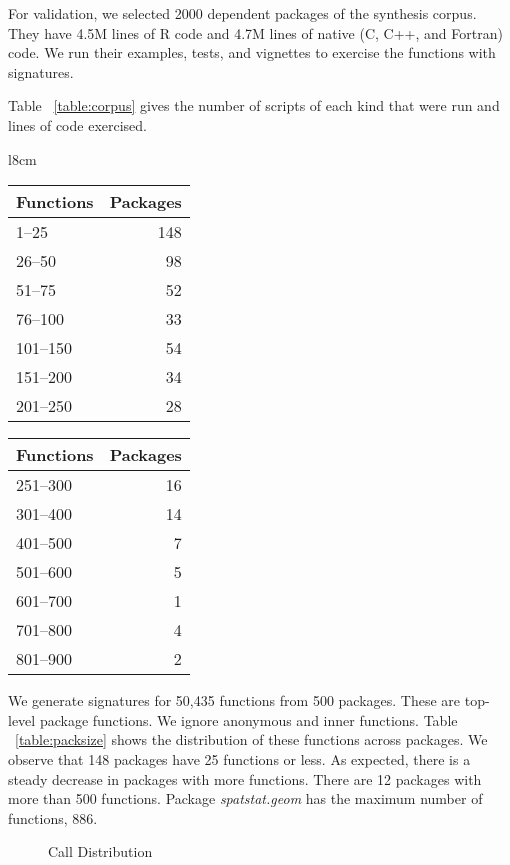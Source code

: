 \documentclass[review,nonacm,screen,acmsmall,anonymous=true]{acmart}
\begin{document}
For validation, we selected 2000 dependent packages of the synthesis
corpus. They have 4.5M lines of R code and 4.7M lines of native (C, C++, and
Fortran) code. We run their examples, tests, and vignettes to exercise the
functions with signatures.

Table ~\ref{table:corpus} gives the number of scripts of each kind that were run
and lines of code exercised.

\begin{wraptable}{l}{8cm}
  \vspace{-3mm}
  \small
  \caption{Package Size} \label{table:packsize}
  \centering
  \begin{tabular}{lr}
    \toprule
    \bf Functions&\bf Packages\\
    \midrule
    1--25&148\\
    26--50&98\\
    51--75&52\\
    76--100&33\\
    101--150&54\\
    151--200&34\\
    201--250&28\\
    \bottomrule
  \end{tabular}
  \quad
  \begin{tabular}{lr}
    \toprule
    \bf Functions&\bf Packages\\
    \midrule
    251--300&16\\
    301--400&14\\
    401--500&7\\
    501--600&5\\
    601--700&1\\
    701--800&4\\
    801--900&2\\
    \bottomrule
  \end{tabular}
\end{wraptable}

We generate signatures for 50,435 functions from 500 packages. These are
top-level package functions. We ignore anonymous and inner functions. Table
~\ref{table:packsize} shows the distribution of these functions across packages.
We observe that 148 packages have 25 functions or less. As expected, there is a
steady decrease in packages with more functions. There are 12 packages with more
than 500 functions. Package \emph{spatstat.geom} has the maximum number of
functions, 886.

\begin{figure}[!h]
  \centering
  
  \caption{Call Distribution}
  \label{fig:callDist}
\end{figure}
\end{document}
